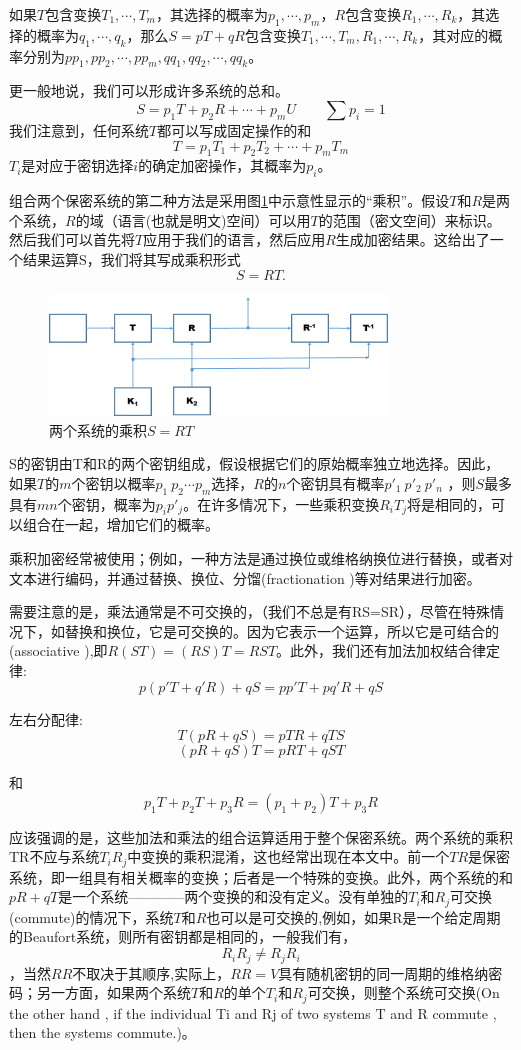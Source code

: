 \documentclass[]{article}
\begin{document}
如果$T$包含变换$T_1,\cdots,T_m$，其选择的概率为$p_1,\cdots,p_m$，$R$包含变换$R_1,\cdots,R_k$，其选择的概率为$q_1,\cdots,q_k$，那么$S=pT+qR$包含变换$T_1,\cdots,T_m,R_1,\cdots,R_k$，其对应的概率分别为$pp_1,pp_2,\cdots,pp_m,qq_1,qq_2,\cdots,qq_k$。

更一般地说，我们可以形成许多系统的总和。
\[S=p_1T+p_2R+\cdots+p_mU \qquad \sum p_i=1\]
我们注意到，任何系统$T$都可以写成固定操作的和
\[T=p_1T_1+p_2T_2+\cdots+p_mT_m\]
$T_i$是对应于密钥选择$i$的确定加密操作，其概率为$p_i$。

组合两个保密系统的第二种方法是采用图\ref{Fig:fig3}中示意性显示的“乘积”。假设$T$和$R$是两个系统，$R$的域（语言(也就是明文)空间）可以用$T$的范围（密文空间）来标识。然后我们可以首先将$T$应用于我们的语言，然后应用$R$生成加密结果。这给出了一个结果运算S，我们将其写成乘积形式
\[S=RT.\]

\begin{figure}[htbp]
	\centering
	\includegraphics[width=0.8\textwidth]{fig3.png}
	\caption{两个系统的乘积$S=RT$}
	\label{Fig:fig3}
\end{figure}

S的密钥由T和R的两个密钥组成，假设根据它们的原始概率独立地选择。因此，如果$T$的$m$个密钥以概率$p_1\ p_2\cdots p_m$选择，$R$的$n$个密钥具有概率$p'_1\ p'_2\ p'_n$ ，则$S$最多具有$mn$个密钥，概率为$p_ip'_j$。在许多情况下，一些乘积变换$R_iT_j$将是相同的，可以组合在一起，增加它们的概率。

乘积加密经常被使用；例如，一种方法是通过换位或维格纳换位进行替换，或者对文本进行编码，并通过替换、换位、分馏(fractionation )等对结果进行加密。

需要注意的是，乘法通常是不可交换的，（我们不总是有RS=SR），尽管在特殊情况下，如替换和换位，它是可交换的。因为它表示一个运算，所以它是可结合的(associative ),即$R(ST)=(RS)T=RST$。此外，我们还有加法加权结合律定律:
\[p(p'T+q'R)+qS=pp'T+pq'R+qS\]

左右分配律:
\[T(pR+qS)=pTR+qTS\]
\[(pR+qS)T = pRT + qST\]

和
\[p_1T+p_2T+p_3R=(p_1+p_2)T+p_3R\]

应该强调的是，这些加法和乘法的组合运算适用于整个保密系统。两个系统的乘积TR不应与系统$T_iR_j$中变换的乘积混淆，这也经常出现在本文中。前一个$TR$是保密系统，即一组具有相关概率的变换；后者是一个特殊的变换。此外，两个系统的和$pR+qT$是一个系统————两个变换的和没有定义。没有单独的$T_i$和$R_j$可交换(commute)的情况下，系统$T$和$R$也可以是可交换的,例如，如果R是一个给定周期的Beaufort系统，则所有密钥都是相同的，一般我们有，
\[R_iR_j\neq R_jR_i\]
，当然$RR$不取决于其顺序,实际上，$RR=V$具有随机密钥的同一周期的维格纳密码；另一方面，如果两个系统$T$和$R$的单个$T_i$和$R_j$可交换，则整个系统可交换(On the other hand , if the individual Ti and Rj of two systems T and R commute , then the systems commute.)。
\end{document}
